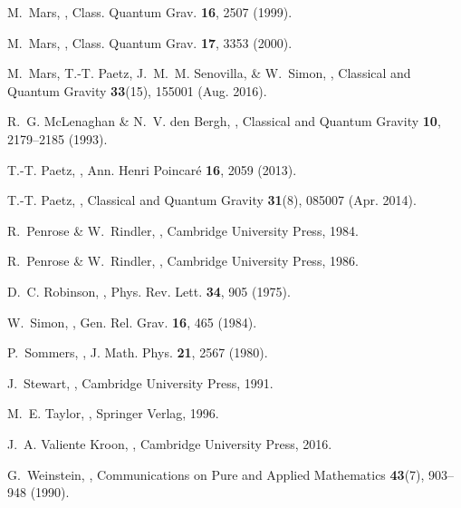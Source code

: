 \documentclass[10pt,a4paper]{article}
\theoremstyle{plain}
\begin{document}
\begin{thebibliography}{10}
M.~Mars,
,
\newblock Class. Quantum Grav. {\bf 16}, 2507 (1999).

M.~Mars,
,
\newblock Class. Quantum Grav. {\bf 17}, 3353 (2000).

M.~{Mars}, T.-T. {Paetz}, J.~M.~M. {Senovilla}, \& W.~{Simon},
,
\newblock Classical and Quantum Gravity {\bf 33}(15), 155001 (Aug. 2016).

R.~G. McLenaghan \& N.~V. den Bergh,
,
\newblock Classical and Quantum Gravity {\bf 10}, 2179--2185 (1993).

T.-T. Paetz,
,
\newblock Ann. Henri Poincar\'{e} {\bf 16}, 2059 (2013).

T.-T. {Paetz},
,
\newblock Classical and Quantum Gravity {\bf 31}(8), 085007 (Apr. 2014).

R.~Penrose \& W.~Rindler,
,
\newblock Cambridge University Press, 1984.

R.~Penrose \& W.~Rindler,
,
\newblock Cambridge University Press, 1986.

D.~C. Robinson,
,
\newblock Phys. Rev. Lett. {\bf 34}, 905 (1975).

W.~Simon,
,
\newblock Gen. Rel. Grav. {\bf 16}, 465 (1984).

P.~Sommers,
,
\newblock J. Math. Phys. {\bf 21}, 2567 (1980).

J.~Stewart,
,
\newblock Cambridge University Press, 1991.

M.~E. Taylor,
,
\newblock Springer Verlag, 1996.

J.~A. {Valiente Kroon},
,
\newblock Cambridge University Press, 2016.

G.~Weinstein,
,
\newblock Communications on Pure and Applied Mathematics {\bf 43}(7), 903--948
  (1990).

\end{thebibliography}
\end{document}
